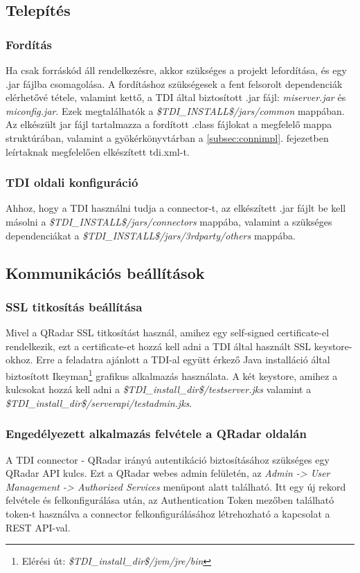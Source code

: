 \subsection{Telepítés}

\subsubsection{Fordítás}
Ha csak forráskód áll rendelkezésre, akkor szükséges a projekt lefordítása, és egy .jar fájlba csomagolása. A fordításhoz szükségesek a fent felsorolt dependenciák elérhetővé tétele, valamint kettő, a TDI által biztosított .jar fájl: \textit{miserver.jar} és \textit{miconfig.jar}. Ezek megtalálhatók a \textit{\$TDI\_INSTALL\$/jars/common} mappában. 
Az elkészült jar fájl tartalmazza a fordított .class fájlokat a megfelelő mappa struktúrában, valamint a gyökérkönyvtárban a \ref{subsec:connimpl}. fejezetben leírtaknak megfelelően elkészített tdi.xml-t.

\subsubsection{TDI oldali konfiguráció}
Ahhoz, hogy a TDI használni tudja a connector-t, az elkészített .jar fájlt be kell másolni a \textit{\$TDI\_INSTALL\$/jars/connectors} mappába, valamint a szükséges dependenciákat a \textit{\$TDI\_INSTALL\$/jars/3rdparty/others} mappába.
\subsection{Kommunikációs beállítások}

\subsubsection{SSL titkosítás beállítása}
Mivel a QRadar SSL titkosítást használ, amihez egy self-signed certificate-el rendelkezik, ezt a certificate-et hozzá kell adni a TDI által használt SSL keystore-okhoz. Erre a feladatra ajánlott a TDI-al együtt érkező Java installáció által biztosított Ikeyman\footnote{Elérési út: \textit{\$TDI\_install\_dir\$/jvm/jre/bin}} grafikus alkalmazás használata. A két keystore, amihez a kulcsokat hozzá kell adni a \textit{\$TDI\_install\_dir\$/testserver.jks} valamint a \textit{\$TDI\_install\_dir\$/serverapi/testadmin.jks}.\cite{qradarssl}

\subsubsection{Engedélyezett alkalmazás felvétele a QRadar oldalán }
A TDI connector - QRadar irányú autentikáció biztosításához szükséges egy QRadar API kulcs. Ezt a QRadar webes admin felületén, az \textit{Admin -> User Management -> Authorized Services} menüpont alatt található. Itt egy új rekord felvétele és felkonfigurálása után, az Authentication Token mezőben található token-t használva a connector felkonfigurálásához létrehozható a kapcsolat a REST API-val. 

